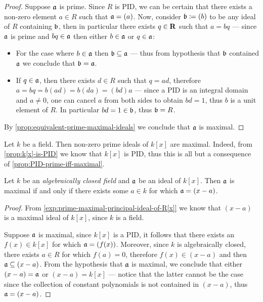 \begin{proof}
Suppose \(\mathfrak{a}\) is prime. Since \(R\) is PID, we can be certain that there
exists a non-zero element \(a \in R\) such that \(\mathfrak{a} = (a)\). Now,
consider \(\mathfrak{b} \coloneq (b)\) to be any ideal of \(R\) containing
\(\mathfrak{b}\), then in particular there exists \(q \in \mathbf{R}\) such that
\(a = b q\) --- since \(\mathfrak{a}\) is prime and \(bq \in \mathfrak{a}\) then
either \(b \in \mathfrak{a}\) or \(q \in \mathfrak{a}\):
\begin{itemize}\setlength\itemsep{0em}
\item For the case where \(b \in \mathfrak{a}\) then
  \(\mathfrak{b} \subseteq \mathfrak{a}\) --- thus from hypothesis that \(\mathfrak{b}\)
  contained \(\mathfrak{a}\) we conclude that \(\mathfrak{b} = \mathfrak{a}\).

\item If \(q \in \mathfrak{a}\), then there exists \(d \in R\) such that
  \(q = a d\), therefore \(a = b q = b (a d) = b (d a) = (b d) a\) --- since
  a PID is an integral domain and \(a \neq 0\), one can cancel \(a\) from both
  sides to obtain \(b d = 1\), thus \(b\) is a unit element of \(R\). In
  particular \(b d = 1 \in \mathfrak{b}\), thus \(\mathfrak{b} = R\).
\end{itemize}
By \cref{prop:equivalent-prime-maximal-ideals} we conclude that \(\mathfrak{a}\) is
maximal.
\end{proof}

\begin{example}
\label{exp:prime-ideals-of-k[x]-are-maximal}
Let \(k\) be a field. Then non-zero prime ideals of \(k[x]\) are
maximal. Indeed, from \cref{prop:k[x]-is-PID} we know that \(k[x]\) is PID, thus
this is all but a consequence of \cref{prop:PID-prime-iff-maximal}.
\end{example}

\begin{proposition}
\label{prop:alg-closed-field-maximal-iff-(x-a)}
Let \(k\) be an \emph{algebraically closed field} and \(\mathfrak{a}\) be an ideal
of \(k[x]\). Then \(\mathfrak{a}\) is maximal if and only if there exists some
\(a \in k\) for which \(\mathfrak{a} = (x - a)\).
\end{proposition}

\begin{proof}
From \cref{exp:prime-maximal-principal-ideal-of-R[x]} we know that \((x - a)\)
is a maximal ideal of \(k[x]\), since \(k\) is a field.

Suppose \(\mathfrak{a}\) is maximal, since \(k[x]\) is a PID, it follows that there
exists an \(f(x) \in k[x]\) for which \(\mathfrak{a} = (f(x))\). Moreover, since
\(k\) is algebraically closed, there exists \(a \in R\) for which \(f(a) = 0\),
therefore \(f(x) \in (x - a)\) and then \(\mathfrak{a} \subseteq (x - a)\). From
the hypothesis that \(\mathfrak{a}\) is maximal, we conclude that either
\((x - a) = \mathfrak{a}\) or \((x - a) = k[x]\) --- notice that the latter cannot
be the case since the collection of constant polynomials is not contained in
\((x - a)\), thus \(\mathfrak{a} = (x - a)\).
\end{proof}

